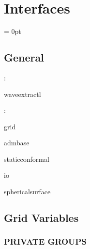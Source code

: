 \documentclass{article}
\begin{document}
\section{Interfaces} 


\parskip = 0pt

\vspace{3mm} \subsection*{General}

: 

waveextractl
\vspace{2mm}

: 

grid

admbase

staticconformal

io

sphericalsurface
\vspace{2mm}
\subsection*{Grid Variables}
\vspace{5mm}\subsubsection{PRIVATE GROUPS}

\vspace{5mm}
\end{document}
